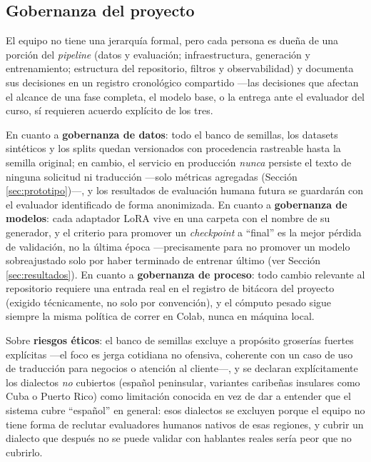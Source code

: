 \documentclass[11pt,a4paper]{article}
\begin{document}
\subsection{Gobernanza del proyecto}
\label{sec:gobernanza}

El equipo no tiene una jerarquía formal, pero cada persona es dueña de una porción del \textit{pipeline} (datos y evaluación; infraestructura, generación y entrenamiento; estructura del repositorio, filtros y observabilidad) y documenta sus decisiones en un registro cronológico compartido —las decisiones que afectan el alcance de una fase completa, el modelo base, o la entrega ante el evaluador del curso, sí requieren acuerdo explícito de los tres.

En cuanto a \textbf{gobernanza de datos}: todo el banco de semillas, los datasets sintéticos y los splits quedan versionados con procedencia rastreable hasta la semilla original; en cambio, el servicio en producción \emph{nunca} persiste el texto de ninguna solicitud ni traducción —solo métricas agregadas (Sección \ref{sec:prototipo})—, y los resultados de evaluación humana futura se guardarán con el evaluador identificado de forma anonimizada. En cuanto a \textbf{gobernanza de modelos}: cada adaptador LoRA vive en una carpeta con el nombre de su generador, y el criterio para promover un \textit{checkpoint} a ``final'' es la mejor pérdida de validación, no la última época —precisamente para no promover un modelo sobreajustado solo por haber terminado de entrenar último (ver Sección \ref{sec:resultados}). En cuanto a \textbf{gobernanza de proceso}: todo cambio relevante al repositorio requiere una entrada real en el registro de bitácora del proyecto (exigido técnicamente, no solo por convención), y el cómputo pesado sigue siempre la misma política de correr en Colab, nunca en máquina local.

Sobre \textbf{riesgos éticos}: el banco de semillas excluye a propósito groserías fuertes explícitas —el foco es jerga cotidiana no ofensiva, coherente con un caso de uso de traducción para negocios o atención al cliente—, y se declaran explícitamente los dialectos \emph{no} cubiertos (español peninsular, variantes caribeñas insulares como Cuba o Puerto Rico) como limitación conocida en vez de dar a entender que el sistema cubre ``español'' en general: esos dialectos se excluyen porque el equipo no tiene forma de reclutar evaluadores humanos nativos de esas regiones, y cubrir un dialecto que después no se puede validar con hablantes reales sería peor que no cubrirlo.
\end{document}
